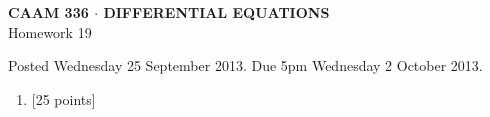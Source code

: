 \documentclass[10pt]{article}
\begin{document}
\vspace*{-5em}
\begin{center}
\large \textsf{\textbf{CAAM 336 $\cdot$ DIFFERENTIAL EQUATIONS}\\[0.5em]
Homework 19 }
\end{center}

Posted Wednesday 25 September 2013.  Due 5pm Wednesday 2 October 2013.

\begin{enumerate}\addtocounter{enumi}{18}
\item {[25 points]}  
\end{enumerate}
\end{document}
